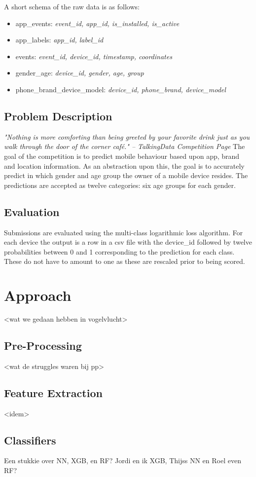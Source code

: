 \documentclass[runningheads,a4paper]{llncs}
\begin{document}
A short schema of the raw data is as follows:
\begin{itemize}
\item app\_events: \textit{event\_id, app\_id, is\_installed, is\_active}
\item app\_labels: \textit{app\_id, label\_id}
\item events: \textit{event\_id, device\_id, timestamp, coordinates}
\item gender\_age: \textit{device\_id, gender, age, group}
\item phone\_brand\_device\_model: \textit{device\_id, phone\_brand, device\_model}
\end{itemize}

\subsection{Problem Description}
\textit{"Nothing is more comforting than being greeted by your favorite drink just as you walk through the door of the corner café." -- TalkingData Competition Page }
The goal of the competition is to predict mobile behaviour based upon app, brand and location information. As an abstraction upon this, the goal is to accurately predict in which gender and age group the owner of a mobile device resides. The predictions are accepted as twelve categories: six age groups for each gender. 
\subsection{Evaluation}
Submissions are evaluated using the multi-class logarithmic loss algorithm. For each device the output is a row in a csv file with the device\_id followed by twelve probabilities between 0 and 1 corresponding to the prediction for each class. These do not have to amount to one as these are rescaled prior to being scored. 
\section{Approach}
<wat we gedaan hebben in vogelvlucht>
\subsection{Pre-Processing}
<wat de struggles waren bij pp>
\subsection{Feature Extraction}
<idem>
\subsection{Classifiers}
Een stukkie over NN, XGB, en RF? Jordi en ik XGB, Thijss NN en Roel even RF?
\end{document}
